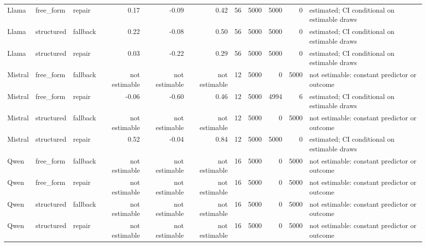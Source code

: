 \begin{tabular}{lllrrrrrrrl}
Llama & free\_form & repair & 0.17 & -0.09 & 0.42 & 56 & 5000 & 5000 & 0 & estimated; CI conditional on estimable draws \\
Llama & structured & fallback & 0.22 & -0.08 & 0.50 & 56 & 5000 & 5000 & 0 & estimated; CI conditional on estimable draws \\
Llama & structured & repair & 0.03 & -0.22 & 0.29 & 56 & 5000 & 5000 & 0 & estimated; CI conditional on estimable draws \\
Mistral & free\_form & fallback & not estimable & not estimable & not estimable & 12 & 5000 & 0 & 5000 & not estimable: constant predictor or outcome \\
Mistral & free\_form & repair & -0.06 & -0.60 & 0.46 & 12 & 5000 & 4994 & 6 & estimated; CI conditional on estimable draws \\
Mistral & structured & fallback & not estimable & not estimable & not estimable & 12 & 5000 & 0 & 5000 & not estimable: constant predictor or outcome \\
Mistral & structured & repair & 0.52 & -0.04 & 0.84 & 12 & 5000 & 5000 & 0 & estimated; CI conditional on estimable draws \\
Qwen & free\_form & fallback & not estimable & not estimable & not estimable & 16 & 5000 & 0 & 5000 & not estimable: constant predictor or outcome \\
Qwen & free\_form & repair & not estimable & not estimable & not estimable & 16 & 5000 & 0 & 5000 & not estimable: constant predictor or outcome \\
Qwen & structured & fallback & not estimable & not estimable & not estimable & 16 & 5000 & 0 & 5000 & not estimable: constant predictor or outcome \\
Qwen & structured & repair & not estimable & not estimable & not estimable & 16 & 5000 & 0 & 5000 & not estimable: constant predictor or outcome \\
\bottomrule
\end{tabular}
